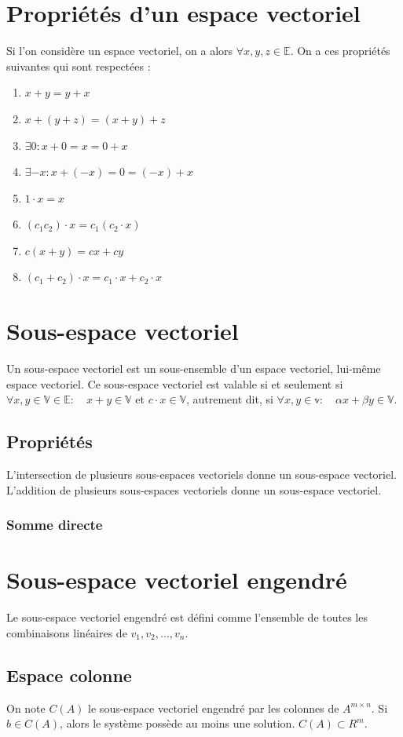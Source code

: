 \documentclass[a4paper]{book}
\begin{document}
\section{Propriétés d'un espace vectoriel}
Si l'on considère un espace vectoriel, on a alors $\forall x,y,z \in \mathbb{E}$. On a ces propriétés suivantes qui sont respectées :
\begin{enumerate}
    \item $x + y = y +x$
    \item $x + (y + z) = (x+y)+z$
    \item $\exists 0 : x + 0 = x = 0 +x$
    \item $\exists -x : x + (-x) = 0 = (-x) + x$
    \item $1 \cdot x = x$
    \item $(c_1 c_2 )\cdot x = c_1 (c_2\cdot x)$
    \item $c(x+y)=cx+cy$
    \item $(c_1+c_2)\cdot x = c_1\cdot x + c_2 \cdot x$
\end{enumerate}
\section{Sous-espace vectoriel}
Un sous-espace vectoriel est un sous-ensemble d'un espace vectoriel, lui-même espace vectoriel. Ce sous-espace vectoriel est valable si et seulement si $\forall x,y \in \mathbb{V} \in \mathbb{E} : \quad x + y \in \mathbb{V}$ et $c\cdot x \in \mathbb{V}$, autrement dit, si  $\forall x,y \in \mathbb{v} : \quad \alpha x + \beta y \in \mathbb{V}$.
\subsection{Propriétés}
L'intersection de plusieurs sous-espaces vectoriels donne un sous-espace vectoriel. L'addition de plusieurs sous-espaces vectoriels donne un sous-espace vectoriel.
\subsubsection{Somme directe}
\section{Sous-espace vectoriel engendré}
Le sous-espace vectoriel engendré est défini comme l'ensemble de toutes les combinaisons linéaires de $v_1,v_2,...,v_n$.
\subsection{Espace colonne}
On note $C(A)$ le sous-espace vectoriel engendré par les colonnes de $A^{m\times n}$. Si $b \in C(A)$, alors le système possède au moins une solution. $C(A) \subset R^m$.
\end{document}
